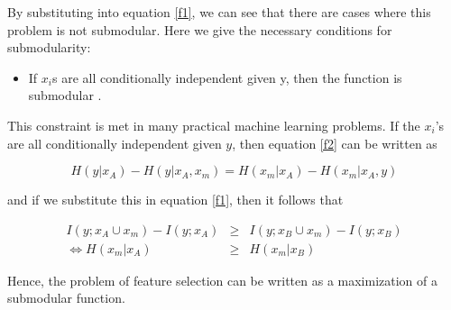 By substituting into equation \ref{f1}, we can see that there are cases where this problem is not submodular. Here we give the necessary conditions for submodularity:

\begin{itemize}
\item {\bf \lemma} If $x_i$s are all conditionally independent given y, then the function is submodular \cite{krausefeature}.
\end{itemize}

This constraint is met in many practical machine learning problems. If the $x_i$'s are all conditionally independent given $y$, then equation \ref{f2} can be written as

\begin{equation*}
H(y|x_A)-H(y|x_A,x_m)=H(x_m|x_A)-H(x_m|x_A,y)
\end{equation*}

and if we substitute this in equation \ref{f1}, then it follows that 

\begin{eqnarray*}
I(y;x_A \cup x_m) - I(y;x_A) &\geq & I(y;x_B \cup x_m) - I(y;x_B) \nonumber \\
\Leftrightarrow H(x_m|x_A) &\geq & H(x_m|x_B)
\end{eqnarray*} 

Hence, the problem of feature selection can be written as a maximization of a submodular function.\cite{jie}
